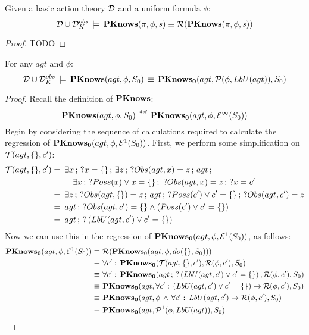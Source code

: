 \begin{thmext}
[{{[}{{[}{\ref{thm:Reg_PKnows}}]}]}] Given a basic action theory
$\mathcal{D}$ and a uniform formula $\phi$:\[
\mathcal{D}\cup\mathcal{D}_{K}^{obs}\,\models\,\mathbf{PKnows}(\pi,\phi,s)\equiv\mathcal{R}(\mathbf{PKnows}(\pi,\phi,s))\]

\end{thmext}
\begin{proof}
TODO 
\end{proof}
\begin{lemmaext}
[{{[}{{[}{\ref{lem:Pknows_LbU_S0}}]}]}] For any $agt$ and $\phi$:\[
\mathcal{D}\cup\mathcal{D}_{K}^{obs}\,\models\,\mathbf{PKnows}(agt,\phi,S_{0})\,\equiv\,\mathbf{PKnows_{0}}(agt,\mathcal{P}(\phi,LbU(agt)),S_{0})\]

\end{lemmaext}
\begin{proof}
Recall the definition of $\mathbf{PKnows}$:\[
\mathbf{PKnows}(agt,\phi,S_{0})\,\stackrel{\mbox{\tiny def}}{=}\,\mathbf{PKnows_{0}}(agt,\phi,\mathcal{E}^{\infty}(S_{0}))\]
 Begin by considering the sequence of calculations required to calculate
the regression of $\mathbf{PKnows_{0}}(agt,\phi,\mathcal{E}^{1}(S_{0}))$. First,
we perform some simplification on $\mathcal{T}(agt,\{\},c')$:\begin{align*}
\mathcal{T}(agt,\{\},c')=\,\,\, & \exists x\,;\,?x=\{\}\,;\,\exists z\,;\,?Obs(agt,x)=z\,;\, agt\,;\\
 & \,\,\,\,\,\,\exists x\,;\,?Poss(x)\vee x=\{\}\,;\,\,?Obs(agt,x)=z\,;\,?x=c'\\
=\,\,\, & \exists z\,;\,?Obs(agt,\{\})=z\,;\, agt\,;\,?Poss(c')\vee c'=\{\}\,;\,?Obs(agt,c')=z\\
=\,\,\, & agt\,;\,?Obs(agt,c')=\{\}\wedge\left(Poss(c')\vee c'=\{\}\right)\\
=\,\,\, & agt\,;\,?\left(LbU(agt,c')\vee c'=\{\}\right)\end{align*}
 Now we can use this in the regression of $\mathbf{PKnows_{0}}(agt,\phi,\mathcal{E}^{1}(S_{0}))$,
as follows: \begin{align*}
\mathbf{PKnows_{0}}(agt,\phi,\mathcal{E}^{1}(S_{0}))\equiv\,\, & \mathcal{R}(\mathbf{PKnows}_{0}(agt,\phi,do(\{\},S_{0})))\\
\equiv\,\, & \forall c':\,\mathbf{PKnows_{0}}(\mathcal{T}(agt,\{\},c'),\mathcal{R}(\phi,c'),S_{0})\\
\equiv\,\, & \forall c':\,\mathbf{PKnows_{0}}(agt\,;\,?\left(LbU(agt,c')\vee c'=\{\}\right),\mathcal{R}(\phi,c'),S_{0})\\
\equiv\,\, & \mathbf{PKnows_{0}}(agt,\forall c':\,\left(LbU(agt,c')\vee c'=\{\}\right)\rightarrow\mathcal{R}(\phi,c'),S_{0})\\
\equiv\,\, & \mathbf{PKnows_{0}}(agt,\phi\,\wedge\,\forall c':\, LbU(agt,c')\rightarrow\mathcal{R}(\phi,c'),S_{0})\\
\equiv\,\, & \mathbf{PKnows_{0}}(agt,\mathcal{P}^{1}(\phi,LbU(agt)),S_{0})\end{align*}



\end{proof}
